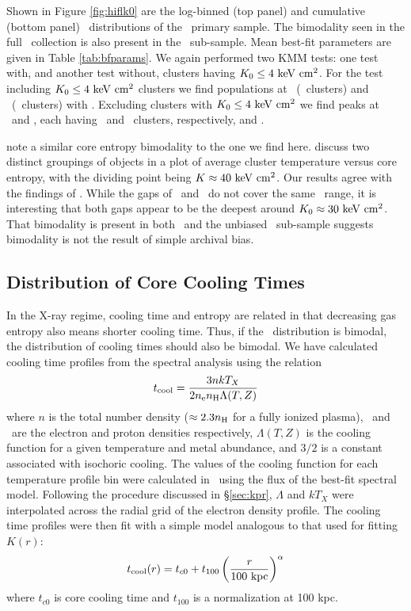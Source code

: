 \documentclass[12pt,preprint]{aastex}
\begin{document}
Shown in Figure \ref{fig:hiflk0} are the log-binned (top panel) and
cumulative (bottom panel) \kna\ distributions of the \hifl\ primary
sample. The bimodality seen in the full \accept\ collection is also
present in the \hifl\ sub-sample. Mean best-fit parameters are given
in Table \ref{tab:bfparams}. We again performed two KMM tests: one
test with, and another test without, clusters having $K_0 \le 4
\mathrm{\mbox{\ensuremath{\mathrm{~keV}}} \mathrm{\mbox{\ensuremath{\mathrm{~cm}}}^2}}$. For the test including $K_0 \le 4 \mathrm{\mbox{\ensuremath{\mathrm{~keV}}} \mathrm{\mbox{\ensuremath{\mathrm{~cm}}}^2}}$ clusters we find
populations at \hiflkmma\ (\hiflkmmc\ clusters) and
\hiflkmmb\ (\hiflkmmd\ clusters) with \hiflkmme. Excluding clusters
with $K_0 \le 4 \mathrm{\mbox{\ensuremath{\mathrm{~keV}}} \mathrm{\mbox{\ensuremath{\mathrm{~cm}}}^2}}$ we find peaks at \hiflkmmf\ and \hiflkmmg, each
having \hiflkmmh\ and \hiflkmmi\ clusters, respectively, and
\hiflkmmj.

\citet{2007hvcg.conf...42H} note a similar core entropy bimodality to
the one we find here. \citet{2007hvcg.conf...42H} discuss two distinct
groupings of objects in a plot of average cluster temperature versus
core entropy, with the dividing point being $K \approx 40 \mathrm{\mbox{\ensuremath{\mathrm{~keV}}} \mathrm{\mbox{\ensuremath{\mathrm{~cm}}}^2}}$. Our
results agree with the findings of \citet{2007hvcg.conf...42H}. While
the gaps of \accept\ and \hifl\ do not cover the same \kna\ range, it
is interesting that both gaps appear to be the deepest around $K_0
\approx 30 \mathrm{\mbox{\ensuremath{\mathrm{~keV}}} \mathrm{\mbox{\ensuremath{\mathrm{~cm}}}^2}}$. That bimodality is present in both \accept\ and the
unbiased \hifl\ sub-sample suggests bimodality is not the result of
simple archival bias.

\subsection{Distribution of Core Cooling Times}
\label{sec:hifl}

In the X-ray regime, cooling time and entropy are related in that
decreasing gas entropy also means shorter cooling time. Thus, if the
\kna\ distribution is bimodal, the distribution of cooling times
should also be bimodal. We have calculated cooling time profiles from
the spectral analysis using the relation
\begin{equation}
t_{\mathrm{cool}} = \frac{3nkT_X}{2n_{\mathrm{e}} n_{\mathrm{H}} \Lambda(T,Z)}
\label{eqn:tcool}
\end{equation}
where $n$ is the total number density ($\approx 2.3n_{\mathrm{H}}$ for a fully
ionized plasma), \nelec\ and \nH\ are the electron and proton
densities respectively, $\Lambda(T,Z)$ is the cooling function for a
given temperature and metal abundance, and $3/2$ is a constant
associated with isochoric cooling. The values of the cooling function
for each temperature profile bin were calculated in \xspec\ using the
flux of the best-fit spectral model. Following the procedure discussed
in \S\ref{sec:kpr}, $\Lambda$ and $kT_X$ were interpolated across the
radial grid of the electron density profile. The cooling time profiles
were then fit with a simple model analogous to that used for fitting
$K(r)$:
\begin{equation}
t_{\mathrm{cool}}(r) = t_{c0} + t_{100} \left(\frac{r}{100 \mbox{\ensuremath{\mathrm{~kpc}}}}\right)^{\alpha}
\label{eqn:tc0}
\end{equation}
where $t_{c0}$ is core cooling time and $t_{100}$ is a normalization
at 100 kpc.
\end{document}
